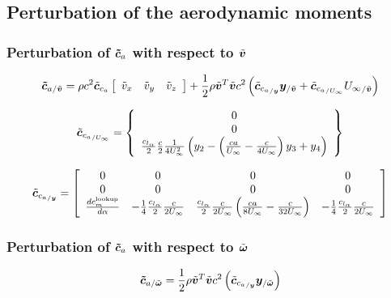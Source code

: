 \subsection{Perturbation of the aerodynamic moments}
\subsubsection{Perturbation of $\bm{\tilde{c}}_a$ with respect to $\tilde{\bm{v}}$}
		
\begin{equation}
\bm{\tilde{c}}_{a/\tilde{\bm{v}}} = 
	\rho c^2 \tilde{\bm{c}}_{c_{a}} \left[
		\begin{array}{ccc}
			\tilde{v}_x & \tilde{v}_y & \tilde{v}_z
		\end{array} \right] +
	\frac{1}{2} \rho \tilde{\bm{v}}^T \tilde{\bm{v}} c^2
	\left(  \tilde{\bm{c}}_{{c_{a}}_{/\bm{y}}} \bm{y}_{/\tilde{\bm{v}}} + 
	\tilde{\bm{c}}_{{c_{a}}_{/U_{\infty}}} {U_\infty}_{/\tilde{\bm{v}}}  \right) 
\end{equation}

\begin{equation}
\tilde{\bm{c}}_{{c_{a}}_{/U_{\infty}}} = \left\{
	\begin{array}{c}
		0 \\
		0 \\
		\frac{c_{l_{\alpha}}}{2} \frac{c}{2} \frac{1}{4 U_\infty^2} 
		\left(  y_2 - \left(  \frac{c a}{U_\infty} - \frac{c}{4 U_\infty}  \right) y_3 +y_4 \right)
	\end{array} \right\}
\end{equation}

\begin{equation}
\tilde{\bm{c}}_{{c_{a}}_{/\bm{y}}} = \left[
	\begin{array}{cccc}
		0 & 0 & 0 & 0 \\
		0 & 0 & 0 & 0 \\
		\frac{ d c_m^{\text{lookup}}}{d \alpha} & 
			-\frac{1}{4} \frac{c_{l_{\alpha}}}{2} \frac{c}{2 U_\infty} &
			\frac{c_{l_{\alpha}}}{2} \frac{c}{2 U_\infty} \left(  \frac{c a}{8 U_\infty} -\frac{c}{32 U_\infty} \right) &
			-\frac{1}{4} \frac{c_{l_{\alpha}}}{2} \frac{c}{2 U_\infty} 
	\end{array} \right]
\end{equation}
\subsubsection{Perturbation of $\bm{\tilde{c}}_a$ with respect to $\tilde{\bm{\omega}}$}
\begin{equation}
\bm{\tilde{c}}_{a/\tilde{\bm{\omega}}} = 
	\frac{1}{2} \rho \tilde{\bm{v}}^T \tilde{\bm{v}} c^2
	\left(  \tilde{\bm{c}}_{{c_{a}}_{/\bm{y}}} \bm{y}_{/\tilde{\bm{\omega}}}  \right) 
\end{equation}
